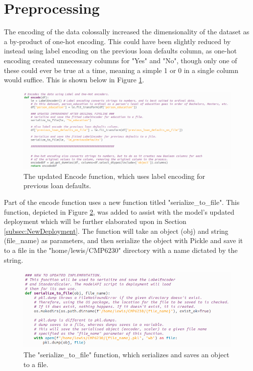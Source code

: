 \documentclass[12pt]{report}
\begin{document}
\section{Preprocessing}
The encoding of the data colossally increased the dimensionality of the dataset as a by-product of one-hot encoding.
This could have been slightly reduced by instead using label encoding on the previous loan defaults column, as one-hot encoding 
created unnecessary columns for "Yes" and "No", though only one of these could ever be true at a time, meaning a simple 1 or 0
in a single column would suffice. This is shown below in Figure \ref{fig:PreprocessingCode1NEW}.

\begin{figure}[H]
    \centering
    \includegraphics[width=\linewidth]{Implementation/JAN 10 UPDATES/NewEncoding.png}
    \caption{The updated Encode function, which uses label encoding for previous loan defaults.}
    \label{fig:PreprocessingCode1NEW}
\end{figure}

\noindent Part of the encode function uses a new function titled "serialize\_to\_file". This function, depicted in Figure \ref{fig:SerializeToFile},
was added to assist with the model's updated deployment which will be further elaborated upon in Section \ref{subsec:NewDeployment}. 
The function will take an object (obj) and string (file\_name) as parameters, and then serialize the object with Pickle and save it to a file
in the "home/lewis/CMP6230" directory with a name dictated by the string.

\begin{figure}[H]
    \centering
    \includegraphics[width=\linewidth]{Implementation/JAN 10 UPDATES/SerializeToFile.png}
    \caption{The "serialize\_to\_file" function, which serializes and saves an object to a file.}
    \label{fig:SerializeToFile}
\end{figure}
\end{document}
